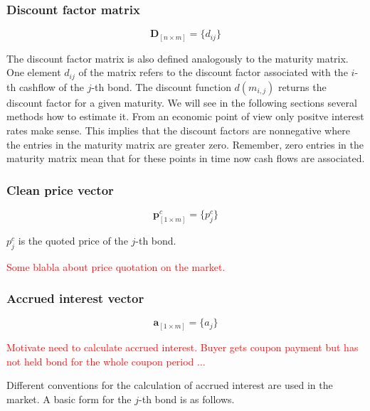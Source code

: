 \subsubsection*{Discount factor matrix}

 \begin{equation}\label{discountm}
\bm{D}_{\left[n\times m\right]}= \{d_{ij}\}
\end{equation}

The discount factor matrix is also defined analogously to the maturity matrix. One element $d_{ij}$ of the matrix refers to the discount factor associated with  the $i$-th cashflow of the $j$-th bond. The discount function $d(m_{i,j})$ returns the discount factor for a given maturity. We will see in the following sections several methods how to estimate it. From an economic point of view only positve interest rates make sense. This implies that the discount factors are nonnegative where the entries in the maturity matrix are greater zero. Remember, zero entries in the maturity matrix mean that for these points in time now cash flows are associated.

\subsubsection*{Clean price vector}

 \begin{equation}\label{pc}
\bm{p}^c_{\left[1\times m\right]}= \{p^c_j\}
\end{equation}

$p_{j}^c$ is the quoted price of the $j$-th bond.

\textcolor{red}{Some blabla about price quotation on the market.}

\subsubsection*{Accrued interest vector}

  \begin{equation}\label{a}
\bm{a}_{\left[1\times m\right]}= \{a_j\}
\end{equation}


\textcolor{red}{Motivate need to calculate accrued interest. Buyer gets coupon payment but has not held bond for the whole coupon period $\dots$}

Different conventions for the calculation of accrued interest are used in the market. A basic form for the $j$-th bond is as follows.

